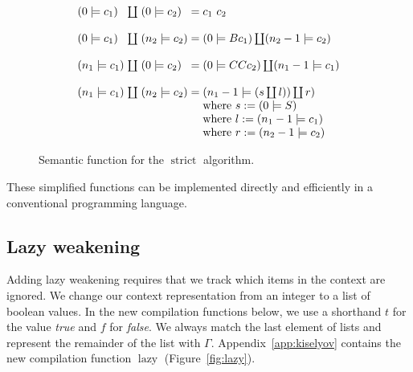 \documentclass[conference]{IEEEtran}
\DeclareMathOperator{\strict}{strict}
\DeclareMathOperator{\lazy}{lazy}
\begin{document}
\begin{figure}
    \begin{equation*}
        \arraycolsep=1.4pt
        \begin{array}{l l l l l}
            (0 \models c_1)   & \coprod & (0 \models c_2)   & = & c_1 \ c_2                                         \\
            \\
            (0 \models c_1)   & \coprod & (n_2 \models c_2) & = & (0 \models B c_1) \coprod (n_2 - 1 \models c_2)   \\
            \\
            (n_1 \models c_1) & \coprod & (0 \models c_2)   & = & (0 \models C C c_2) \coprod (n_1 - 1 \models c_1) \\
            \\
            (n_1 \models c_1) & \coprod & (n_2 \models c_2) & = & (n_1 - 1 \models (s \coprod l)) \coprod r)        \\
                              &         &                   &   & \text{where } s := (0 \models S )                 \\
                              &         &                   &   & \text{where } l := (n_1-1 \models c_1 )           \\
                              &         &                   &   & \text{where } r := (n_2-1 \models c_2 )           \\
        \end{array}
    \end{equation*}
    \centering
    \caption{Semantic function for the $\strict$ algorithm.}
    \label{fig:strict-sem}
\end{figure}

These simplified functions can be implemented directly and efficiently in a conventional programming language.

\subsection{Lazy weakening}
Adding lazy weakening requires that we track which items in the context are ignored.
We change our context representation from an integer to a list of boolean values.
In the new compilation functions below, we use a shorthand $t$ for the value \textit{true} and $f$ for \textit{false}.
We always match the last element of lists and represent the remainder of the list with $\Gamma$.
Appendix~\ref{app:kiselyov} contains the new compilation function $\lazy$ (Figure~\ref{fig:lazy}).
\end{document}
